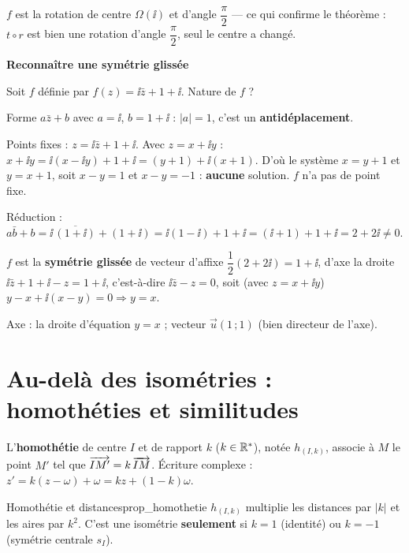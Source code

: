 $f$ est la rotation de centre $\Omega(\ii)$ et d'angle $\dfrac{\pi}{2}$
— ce qui confirme le théorème : $t\circ r$ est bien une rotation d'angle
$\dfrac{\pi}{2}$, seul le centre a changé.

\exerciceresolu
\textbf{Reconnaître une symétrie glissée}

Soit $f$ définie par $f(z) = \ii\bar z + 1 + \ii$. Nature de $f$ ?

\solution

Forme $a\bar z + b$ avec $a=\ii$, $b=1+\ii$ : $|a|=1$, c'est un
\textbf{antidéplacement}.

Points fixes : $z = \ii\bar z + 1 + \ii$. Avec $z=x+\ii y$ :
$x + \ii y = \ii(x - \ii y) + 1 + \ii = (y+1) + \ii(x+1)$.
D'où le système $x = y+1$ et $y = x+1$, soit $x-y=1$ et $x-y=-1$ :
\textbf{aucune} solution. $f$ n'a pas de point fixe.

Réduction : $a\bar b + b = \ii\,\overline{(1+\ii)} + (1+\ii)
= \ii(1-\ii) + 1 + \ii = (\ii + 1) + 1 + \ii = 2 + 2\ii \neq 0$.

$f$ est la \textbf{symétrie glissée} de vecteur d'affixe
$\dfrac12(2+2\ii) = 1+\ii$, d'axe la droite
$\ii\bar z + 1 + \ii - z = 1 + \ii$, c'est-à-dire $\ii\bar z - z = 0$,
soit (avec $z=x+\ii y$) $y - x + \ii(x - y)=0 \Rightarrow y = x$.

Axe : la droite d'équation $y=x$ ; vecteur $\vec u(1\,;1)$ (bien directeur
de l'axe).


\section{Au-delà des isométries : homothéties et similitudes}

\begin{definition}
	L'\textbf{homothétie} de centre $I$ et de rapport $k$ ($k\in\mathbb{R}^*$), notée
	$h_{(I,k)}$, associe à $M$ le point $M'$ tel que $\overrightarrow{IM'}=k\,\overrightarrow{IM}$.
	Écriture complexe : $z' = k(z-\omega)+\omega = kz + (1-k)\omega$.
\end{definition}

\begin{propriete}{Homothétie et distances}{prop_homothetie}
	$h_{(I,k)}$ multiplie les distances par $|k|$ et les aires par $k^2$.
	C'est une isométrie \textbf{seulement} si $k=1$ (identité) ou $k=-1$
	(symétrie centrale $s_I$).
\end{propriete}

